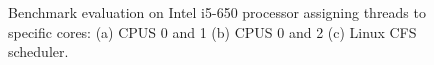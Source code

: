 \documentclass[conference]{IEEEtran}
\begin{document}
\begin{figure}[htb]
\centering
{}
\caption{Benchmark evaluation on Intel i5-650 processor assigning threads to specific cores: (a) CPUS 0 and 1 (b) CPUS 0 and 2 (c) Linux CFS scheduler.}
\label{fig:i5_eval}
\end{figure}
\end{document}

